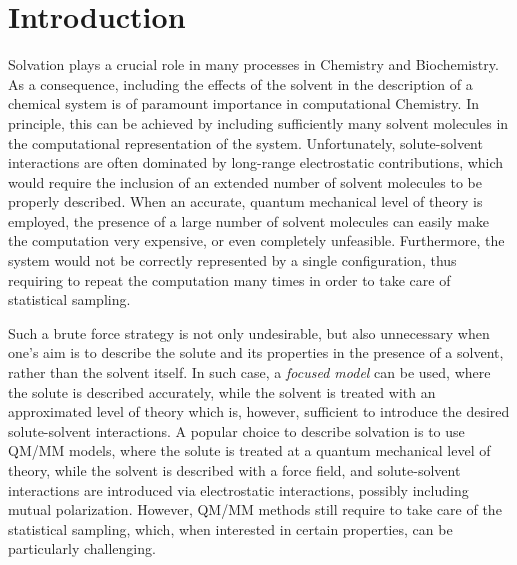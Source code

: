 \section{Introduction}\label{sec:intro}
Solvation plays a crucial role in many processes in Chemistry and Biochemistry. As a consequence, including the effects of the solvent in the description of a chemical system is of paramount importance in computational Chemistry. In principle, this can be achieved by including sufficiently many solvent molecules in the computational representation of the system. Unfortunately, solute-solvent interactions are often dominated by long-range electrostatic contributions, which would require the inclusion of an extended number of solvent molecules to be properly described. When an accurate, quantum mechanical level of theory is employed, the presence of a large number of solvent molecules can easily make the computation very expensive, or even completely unfeasible. Furthermore, the system would not be correctly represented by a single configuration, thus requiring  to repeat the computation many times in order to take care of statistical sampling. 

Such a brute force strategy is not only undesirable, but also unnecessary when one's aim is to describe the solute and its properties in the presence of a solvent, rather than the solvent itself. In such case, a \textit{focused model} can be used, where the solute is described accurately, while the solvent is treated with an approximated level of theory which is, however, sufficient to introduce the desired solute-solvent interactions. 
A popular choice to describe solvation is to use QM/MM models\cite{Warshel_JMB_QMMM,Warshel_JACS_QMMM,Gao_Science_QMMM,Bakowies_JPC_QMMM,Truhlar_TCA_QMMMReview,Thiel_ACIE_QMMMReview,
Barone_Libro_QMMM,Morokuma_CR_ONIOM,Cappelli_IJQC_FQRev}, where the solute is treated at a quantum mechanical level of theory, while the solvent is described with a force field, and solute-solvent interactions are introduced via electrostatic interactions, possibly including mutual polarization\cite{Curutchet_JCTC_MMPol,Kongsted_JCTC_MMPExc,Christiansen_JCTC_MMPExcCCDFT,Steindal_PCCP_MMPExc,Caprasecca_JCTC_FMM,Lipparini_JCP_FQMag,Lipparini_JCTC_FQTD,Boulanger_JCTC_Drude,Boulanger_JCTC_QMMMPolPCM,Loco_JCTC_QMAMOEBA}. However, QM/MM methods still require to take care of the statistical sampling, which, when interested in certain properties, can be particularly challenging\cite{Lipparini_JCTC_ORMoxy,Giovannini_JCTC_FQVCD,Giovannini_JCTC_FQROA}.

